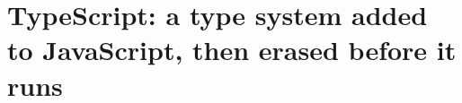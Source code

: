 \chapter{TypeScript: a type system added to JavaScript, then erased before it runs}
\label{ch:typescript-a-type-system-added-to}

